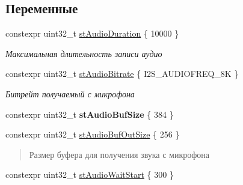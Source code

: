 \subsection*{Переменные}
\begin{DoxyCompactItemize}
\item 
\mbox{\label{namespaceunit_a3a82b0d0086859e1e04e0878fb932db3}} 
constexpr uint32\+\_\+t \hyperlink{namespaceunit_a3a82b0d0086859e1e04e0878fb932db3}{st\+Audio\+Duration} \{ 10000 \}
\begin{DoxyCompactList}\small\item\em Максимальная длительность записи аудио \end{DoxyCompactList}\item 
\mbox{\label{namespaceunit_a7a058e0d07546916ab5dffbec805f5d3}} 
constexpr uint32\+\_\+t \hyperlink{namespaceunit_a7a058e0d07546916ab5dffbec805f5d3}{st\+Audio\+Bitrate} \{ I2\+S\+\_\+\+A\+U\+D\+I\+O\+F\+R\+E\+Q\+\_\+8K \}
\begin{DoxyCompactList}\small\item\em Битрейт получаемый с микрофона \end{DoxyCompactList}\item 
\mbox{\label{namespaceunit_aa54bf911cfb8ceec5aea2b94ac45df4f}} 
constexpr uint32\+\_\+t {\bfseries st\+Audio\+Buf\+Size} \{ 384 \}
\item 
\mbox{\label{namespaceunit_a5aa5a35b383d36943582e4c6fb0f9e4e}} 
constexpr uint32\+\_\+t \hyperlink{namespaceunit_a5aa5a35b383d36943582e4c6fb0f9e4e}{st\+Audio\+Buf\+Out\+Size} \{ 256 \}
\begin{DoxyCompactList}\small\item\em \begin{quote}
Размер буфера для получения звука с микрофона \end{quote}
\end{DoxyCompactList}\item 
\mbox{\label{namespaceunit_a825ea814e5b3276cd5c1cce83c782c70}} 
constexpr uint32\+\_\+t \hyperlink{namespaceunit_a825ea814e5b3276cd5c1cce83c782c70}{st\+Audio\+Wait\+Start} \{ 300 \}
\begin{DoxyCompactList}\small\item\em \begin{quote}

\end{quote}
\end{DoxyCompactList}
\end{DoxyCompactItemize}
